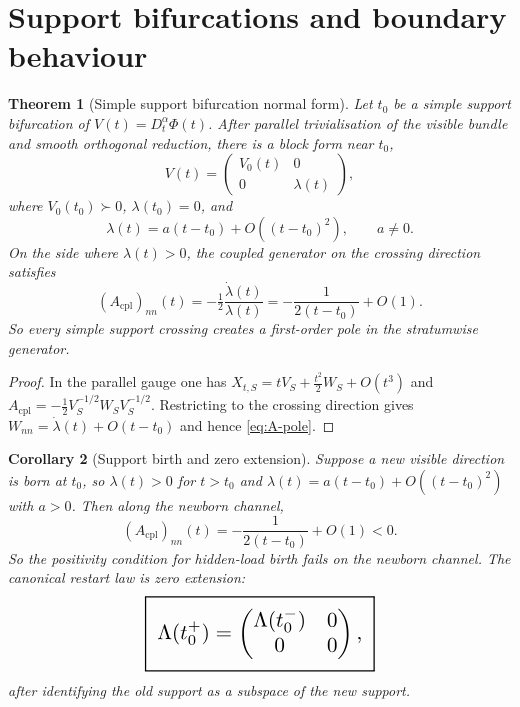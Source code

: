 \documentclass[11pt,a4paper]{article}
\numberwithin{equation}{section}
\newcommand{\geomboxed}[1]{%
  \setlength{\fboxsep}{8pt}%
  \setlength{\fboxrule}{0.9pt}%
  \fbox{\scalebox{1.5}{$\displaystyle #1$}}%
}
\theoremstyle{thmcompact}
\newtheorem{theorem}{Theorem}[section]
\newtheorem{corollary}[theorem]{Corollary}
\theoremstyle{remark}
\begin{document}
\section{Support bifurcations and boundary behaviour}

\begin{theorem}[Simple support bifurcation normal form]
\label{thm:bifurcation-normal-form}
Let $t_0$ be a simple support bifurcation of $V(t)=D_t^\alpha\Phi(t)$. After parallel trivialisation of the visible bundle and smooth orthogonal reduction, there is a block form near $t_0$,
\begin{equation}
V(t)=
\begin{pmatrix}
V_0(t) & 0\\
0 & \lambda(t)
\end{pmatrix},
\label{eq:bifurcation-block-form}
\end{equation}
where $V_0(t_0)\succ0$, $\lambda(t_0)=0$, and
\begin{equation}
\lambda(t)=a(t-t_0)+O((t-t_0)^2),
\qquad a\neq0.
\label{eq:lambda-normal-form}
\end{equation}
On the side where $\lambda(t)>0$, the coupled generator on the crossing direction satisfies
\begin{equation}
\boxed{
(A_{\mathrm{cpl}})_{nn}(t)
=
-\tfrac12\frac{\dot\lambda(t)}{\lambda(t)}
=
-\frac{1}{2(t-t_0)}+O(1).
}
\label{eq:A-pole}
\end{equation}
So every simple support crossing creates a first-order pole in the stratumwise generator.
\end{theorem}

\begin{proof}
In the parallel gauge one has $X_{t,S}=tV_S+\tfrac{t^2}{2}W_S+O(t^3)$ and $A_{\mathrm{cpl}}=-\tfrac12V_S^{-1/2}W_SV_S^{-1/2}$. Restricting to the crossing direction gives $W_{nn}=\dot\lambda(t)+O(t-t_0)$ and hence \eqref{eq:A-pole}.
\end{proof}

\begin{corollary}[Support birth and zero extension]
\label{cor:support-birth}
Suppose a new visible direction is born at $t_0$, so $\lambda(t)>0$ for $t>t_0$ and $\lambda(t)=a(t-t_0)+O((t-t_0)^2)$ with $a>0$. Then along the newborn channel,
\begin{equation}
(A_{\mathrm{cpl}})_{nn}(t)=-\frac{1}{2(t-t_0)}+O(1)<0.
\label{eq:birth-negative-pole}
\end{equation}
So the positivity condition for hidden-load birth fails on the newborn channel. The canonical restart law is zero extension:
\begin{equation}
\geomboxed{
\Lambda(t_0^+)
=
\begin{pmatrix}
\Lambda(t_0^-) & 0\\
0 & 0
\end{pmatrix},
}
\label{eq:zero-extension-law}
\end{equation}
after identifying the old support as a subspace of the new support.
\end{corollary}
\end{document}
